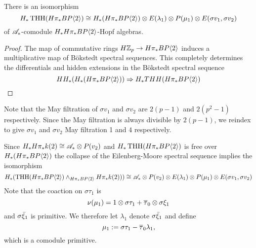 \begin{prop} \label{prop:homologyTHH-E0} There is an isomorphism
\[
H_*\operatorname{THH}(H\pi_*BP\langle 2 \rangle)\cong H_*(H\pi_*BP\langle 2 \rangle)\otimes E(\lambda_1)\otimes P(\mu_1)\otimes E(\sigma v_1,\sigma v_2)
\]
of $\mathscr{A}_*$-comodule $H_*H\pi_*BP\langle 2 \rangle$-Hopf algebras.
\end{prop}
\begin{proof}
The map of commutative rings
$
H\mathbb{Z}_p\to H\pi_*BP\langle 2 \rangle 
$
induces a multiplicative map of B\"okstedt spectral sequences. This completely determines the differentials and hidden extensions in the B\"okstedt spectral sequence
\[ HH_*(H_*(H\pi_*BP\langle 2 \rangle))\Rightarrow H_*THH(H\pi_*BP\langle 2 \rangle)\]
\end{proof}

Note that the May filtration of $\sigma v_1$ and $\sigma v_2$ are $2(p-1)$ and $2(p^2-1)$ respectively. Since the May filtration is always divisible by $2(p-1)$, we reindex to give $\sigma v_1$ and $\sigma v_2$ May filtration 1 and $4$ respectively. 

Since $H_*H\pi_*k(2)\cong \mathscr{A}_*\otimes P(v_2)$ and $H_*\operatorname{THH}(H\pi_*BP\langle 2 \rangle)$ is free over $H_*(H\pi_*BP\langle 2 \rangle)$ the collapse of the Eilenberg-Moore spectral sequence implies the isomorphism
\[
H_*(\operatorname{THH}(H\pi_*BP\langle 2 \rangle)\wedge_{H\pi_*BP\langle 2 \rangle}H\pi_*k(2)))\cong \mathscr{A}_*\otimes P(v_2) \otimes E(\lambda_1)\otimes P(\mu_1)\otimes E(\sigma v_1,\sigma v_2)
\]
 Note that the coaction on $\sigma \tau_1$ is 
\[
\nu(\mu_1) = 1\otimes \sigma \tau_1+\overline{\tau}_0\otimes \sigma \xi_1
\]
and $\sigma \bar{\xi}_1$ is primitive. We therefore let $\lambda_1$ denote $\sigma \bar{\xi}_1$ and define
\[
\mu_1:= \sigma\tau_1-\overline{\tau}_0\lambda_1,
\]
which is a comodule primitive. 

